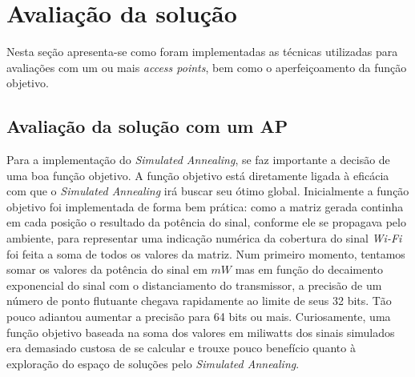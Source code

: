 \documentclass[
	12pt,				%
	twoside,			%
	a4paper,			%
	english,			%
	french,				%
	spanish,			%
	brazil				%
	]{abntex2}
\begin{document}
\section{Avaliação da solução}\label{avaliauxe7uxe3o-da-soluuxe7uxe3o}

Nesta seção apresenta-se como foram implementadas as técnicas utilizadas
para avaliações com um ou mais \emph{access points}, bem como o
aperfeiçoamento da função objetivo.

\subsection{Avaliação da solução com um AP}\label{sec:avalia_one_ap}

Para a implementação do \emph{Simulated Annealing}, se faz importante a
decisão de uma boa função objetivo. A função objetivo está diretamente
ligada à eficácia com que o \emph{Simulated Annealing} irá buscar seu
ótimo global. Inicialmente a função objetivo foi implementada de forma
bem prática: como a matriz gerada continha em cada posição o resultado
da potência do sinal, conforme ele se propagava pelo ambiente, para
representar uma indicação numérica da cobertura do sinal \emph{Wi-Fi}
foi feita a soma de todos os valores da matriz. Num primeiro momento,
tentamos somar os valores da potência do sinal em \(mW\) mas em função
do decaimento exponencial do sinal com o distanciamento do transmissor,
a precisão de um número de ponto flutuante chegava rapidamente ao limite
de seus 32 bits. Tão pouco adiantou aumentar a precisão para 64 bits ou
mais. Curiosamente, uma função objetivo baseada na soma dos valores em
miliwatts dos sinais simulados era demasiado custosa de se calcular e
trouxe pouco benefício quanto à exploração do espaço de soluções pelo
\emph{Simulated Annealing}.
\end{document}
